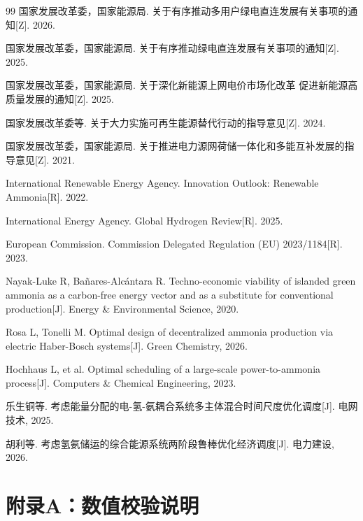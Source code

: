 \documentclass[UTF8,a4paper,12pt]{ctexart}
\begin{document}
\begingroup
\small
\begin{thebibliography}{99}
\setlength{\itemsep}{0.10em}
\setlength{\parsep}{0pt}
国家发展改革委，国家能源局. 关于有序推动多用户绿电直连发展有关事项的通知[Z]. 2026.

国家发展改革委，国家能源局. 关于有序推动绿电直连发展有关事项的通知[Z]. 2025.

国家发展改革委，国家能源局. 关于深化新能源上网电价市场化改革 促进新能源高质量发展的通知[Z]. 2025.

国家发展改革委等. 关于大力实施可再生能源替代行动的指导意见[Z]. 2024.

国家发展改革委，国家能源局. 关于推进电力源网荷储一体化和多能互补发展的指导意见[Z]. 2021.

International Renewable Energy Agency. Innovation Outlook: Renewable Ammonia[R]. 2022.

International Energy Agency. Global Hydrogen Review[R]. 2025.

European Commission. Commission Delegated Regulation (EU) 2023/1184[R]. 2023.

Nayak-Luke R, Bañares-Alcántara R. Techno-economic viability of islanded green ammonia as a carbon-free energy vector and as a substitute for conventional production[J]. Energy \& Environmental Science, 2020.

Rosa L, Tonelli M. Optimal design of decentralized ammonia production via electric Haber-Bosch systems[J]. Green Chemistry, 2026.

Hochhaus L, et al. Optimal scheduling of a large-scale power-to-ammonia process[J]. Computers \& Chemical Engineering, 2023.

乐生铜等. 考虑能量分配的电-氢-氨耦合系统多主体混合时间尺度优化调度[J]. 电网技术, 2025.

胡利等. 考虑氢氨储运的综合能源系统两阶段鲁棒优化经济调度[J]. 电力建设, 2026.
\end{thebibliography}
\endgroup

\clearpage
\appendix

\section{附录A：数值校验说明}
\end{document}
